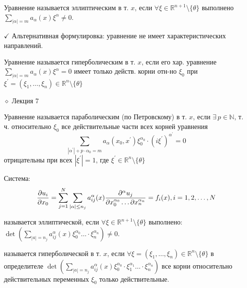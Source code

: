 \documentclass{article}
\begin{document}
\begin{definition}
Уравнение называется эллиптическим в т. $x$, если $\forall \xi  \in \mathbb{R}^{n+1} \setminus \{\theta\}$ выполнено $\sum_{|\alpha|=m} a_\alpha(x) \xi^\alpha \neq 0$.
\end{definition}
$\checkmark$ Альтернативная формулировка: уравнение не имеет характеристических направлений. \\

\begin{definition}
Уравнение называется гиперболическим в т. $x$, если его хар. уравнение $\sum_{|\alpha|=m} a_\alpha(x) \xi^\alpha = 0$ имеет только действ. корни отн-но $\xi_0$ при $\xi^{\prime}=\left(\xi_1, \ldots, \xi_n\right) \in \mathbb{R}^{n} \setminus \{\theta\}$ 
\end{definition}

$\diamond$ Лекция 7

\begin{definition}
Уравнение называется параболическим (по Петровскому) в т. $x$, если $\exists \, p \in \mathbb{N}$, т. ч. относительно $\xi_0$ все действительные части всех корней уравнения
$$
\sum_{\left|\alpha^{\prime}\right|+p \cdot \alpha_0=m} a_\alpha\left(x_0, x^{\prime}\right) \xi_0^{\alpha_0} \cdot\left(i \xi^{\prime}\right)^{\alpha^{\prime}}=0
$$ отрицательны при всех $|\xi^{\prime}| = 1$, где $\xi^{\prime} \in \mathbb{R}^{n} \setminus \{\theta\}$
\end{definition}

\vspace{14}

Система:
$$
\frac{\partial u_i}{ \partial x_0} = \sum_{j=1}^N \sum_{|\alpha| \le n_j } a_{i j}^\alpha(x) \frac{\partial^\alpha u_j}{\partial x_0^{\alpha_0} \ldots \partial x_n^{\alpha_n}}=f_i(x), i=1,2, \ldots, N \\
$$
\begin{definition}
называется эллиптической, если $\forall \xi \in \mathbb{R}^{n+1} \setminus \{\theta\}$ выполнено: $\operatorname{det}\left(\sum_{|a|=n_j}a_{i j}^\alpha(x) \xi_0^{\alpha_0} \ldots \cdot \xi_n^{\alpha_n}\right)  \neq 0$. \\
\end{definition}

\begin{definition}
называется гиперболической в т. $x$, если $\forall  \xi=\left(\xi_1, \ldots, \xi_n\right) \in \mathbb{R}^{n} \setminus \{\theta\}$ в определителе $\operatorname{det}\left(\sum_{|a|=n_j}a_{i j}^\alpha(x) \xi_0^{\alpha_0} \cdot \xi_1^{\alpha_1} \ldots \cdot \xi_n^{\alpha_n}\right)$ все корни относительно действительных переменных $\xi_0$ только действительные. \\
\end{definition}
\end{document}
